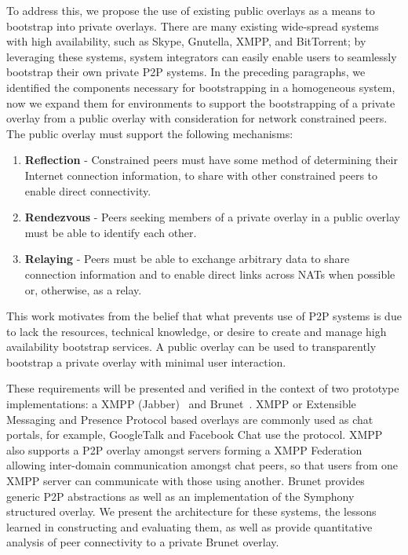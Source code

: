 \documentclass[conference]{IEEEtran}
\begin{document}
To address this, we propose the use of existing public overlays as a means to
bootstrap into private overlays.  There are many existing wide-spread systems
with high availability, such as Skype, Gnutella, XMPP, and BitTorrent; by
leveraging these systems, system integrators can easily enable users to
seamlessly bootstrap their own private P2P systems.  In the preceding
paragraphs, we identified the components necessary for bootstrapping in a
homogeneous system, now we expand them for environments to support the
bootstrapping of a private overlay from a public overlay with consideration for
network constrained peers.  The public overlay must support the following
mechanisms:
\begin{enumerate}
\item \textbf{Reflection} - Constrained peers must have some method of
determining their Internet connection information, to share with other
constrained peers to enable direct connectivity.
\item \textbf{Rendezvous} - Peers seeking members of a private overlay in a
public overlay must be able to identify each other.
\item \textbf{Relaying} - Peers must be able to exchange arbitrary data to
share connection information and to enable direct links across NATs when
possible or, otherwise, as a relay.
\end{enumerate}
This work motivates from the belief that what prevents use of P2P systems is
due to lack the resources, technical knowledge, or desire to create and manage
high availability bootstrap services.  A public overlay can be used to
transparently bootstrap a private overlay with minimal user interaction.

These requirements will be presented and verified in the context of two
prototype implementations: a XMPP (Jabber)~\cite{xmpp} and
Brunet~\cite{brunet}.  XMPP or Extensible Messaging and Presence Protocol based
overlays are commonly used as chat portals, for example, GoogleTalk and
Facebook Chat use the protocol.  XMPP also supports a P2P overlay amongst
servers forming a XMPP Federation allowing inter-domain communication amongst
chat peers, so that users from one XMPP server can communicate with those using
another.  Brunet provides generic P2P abstractions as well as an implementation
of the Symphony structured overlay.  We present the architecture for these
systems, the lessons learned in constructing and evaluating them,  as well as
provide quantitative analysis of peer connectivity to a private Brunet overlay.
\end{document}
